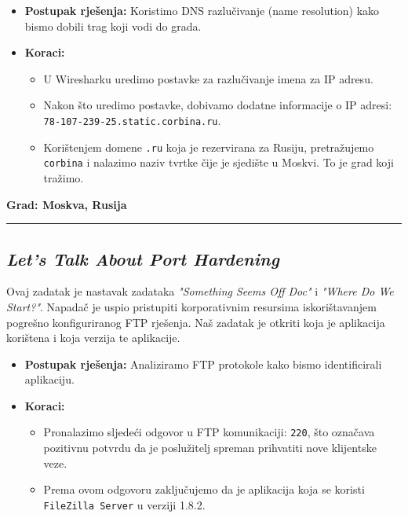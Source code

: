 \documentclass{article}
\begin{document}
\begin{itemize}
    \item \textbf{Postupak rješenja:} Koristimo DNS razlučivanje (name resolution) kako bismo dobili trag koji vodi do grada.
    \item \textbf{Koraci:}
    \begin{itemize}
        \item U Wiresharku uredimo postavke za razlučivanje imena za IP adresu.
        \item Nakon što uredimo postavke, dobivamo dodatne informacije o IP adresi: \texttt{78-107-239-25.static.corbina.ru}.
        \item Korištenjem domene \texttt{.ru} koja je rezervirana za Rusiju, pretražujemo \texttt{corbina} i nalazimo naziv tvrtke čije je sjedište u Moskvi. To je grad koji tražimo.
    \end{itemize}
\end{itemize}

\begin{center}
    \textbf{Grad: Moskva, Rusija}
\end{center}

\noindent\rule{\textwidth}{0.4pt}

\subsection{\textit{Let's Talk About Port Hardening}}
\begin{tcolorbox}[
    colback=gray!5,  %
    colframe=gray!75,  %
    title=\textbf{Zadatak}]
    Ovaj zadatak je nastavak zadataka \textit{"Something Seems Off Doc"} i \textit{"Where Do We Start?"}. Napadač je uspio pristupiti korporativnim resursima iskorištavanjem pogrešno konfiguriranog FTP rješenja. Naš zadatak je otkriti koja je aplikacija korištena i koja verzija te aplikacije.
\end{tcolorbox}

\begin{itemize}
    \item \textbf{Postupak rješenja:} Analiziramo FTP protokole kako bismo identificirali aplikaciju.
    \item \textbf{Koraci:}
    \begin{itemize}
        \item Pronalazimo sljedeći odgovor u FTP komunikaciji: \texttt{220}, što označava pozitivnu potvrdu da je poslužitelj spreman prihvatiti nove klijentske veze.
        \item Prema ovom odgovoru zaključujemo da je aplikacija koja se koristi \texttt{FileZilla Server} u verziji 1.8.2.
    \end{itemize}
\end{itemize}
\end{document}
